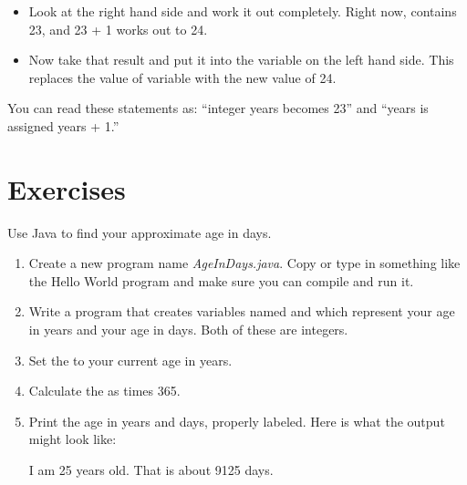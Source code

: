 \begin{itemize}
\item Look at the right hand side and work it out completely. Right now,  contains 23, and 23 + 1 works out to 24.
\item Now take that result and put it into the variable on the left hand side. This replaces the value of variable  with the new value of 24.
\end{itemize}

You can read these statements as:  ``integer years becomes 23'' and ``years is assigned years + 1.''

\section{Exercises}
\begin{exercise}
\label{ex:age}
Use Java to find your approximate age in days.

\begin{enumerate}

\item Create a new program name {\it AgeInDays.java}.
Copy or type in something like the Hello World program and make sure you can compile and run it.

\item Write a program that creates variables named  and  which represent your age in years and your age in days. Both of these are integers.

\item Set the  to your current age in years.

\item Calculate the  as  times 365.

\item Print the age in years and days, properly labeled. Here is what the output might look like:

\begin{stdout}
I am 25 years old.
That is about 9125 days.
\end{stdout}
\end{enumerate}

\end{exercise}


